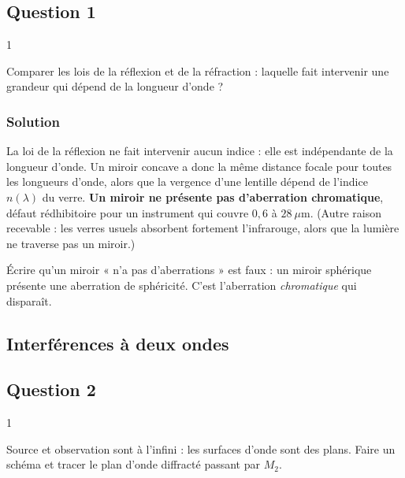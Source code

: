 \documentclass[11pt,a4paper]{article}
\begin{document}
\hypertarget{question-1}{%
\subsection{Question 1}\label{question-1}}

\begin{indication}{1}

Comparer les lois de la réflexion et de la réfraction : laquelle fait intervenir une grandeur qui dépend de la longueur d'onde ?

\end{indication}

\hypertarget{solution}{%
\subsubsection{Solution}\label{solution}}

La loi de la réflexion ne fait intervenir aucun indice : elle est indépendante de la longueur d'onde. Un miroir concave a donc la même distance focale pour toutes les longueurs d'onde, alors que la vergence d'une lentille dépend de l'indice \(n(\lambda)\) du verre. \textbf{Un miroir ne présente pas d'aberration chromatique}, défaut rédhibitoire pour un instrument qui couvre \(0{,}6\) à \(28\ \mu\text{m}\). (Autre raison recevable : les verres usuels absorbent fortement l'infrarouge, alors que la lumière ne traverse pas un miroir.)

\begin{piege}

Écrire qu'un miroir « n'a pas d'aberrations » est faux : un miroir sphérique présente une aberration de sphéricité. C'est l'aberration \emph{chromatique} qui disparaît.

\end{piege}

\hypertarget{interfuxe9rences-uxe0-deux-ondes}{%
\subsection{Interférences à deux ondes}\label{interfuxe9rences-uxe0-deux-ondes}}

\hypertarget{question-2}{%
\subsection{Question 2}\label{question-2}}

\begin{indication}{1}

Source et observation sont à l'infini : les surfaces d'onde sont des plans. Faire un schéma et tracer le plan d'onde diffracté passant par \(M_2\).

\end{indication}
\end{document}
